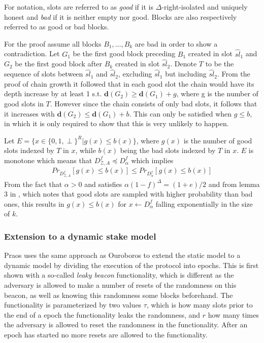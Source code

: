 For notation, slots are referred to as \emph{good} if it is $\Delta$-right-isolated and uniquely honest and \emph{bad} if it is neither empty nor good. Blocks are also respectively referred to as good or bad blocks.

For the proof assume all blocks $B_1,\dots,B_k$ are bad in order to show a contradiction. Let $G_1$ be the first good block preceding $B_1$ created in slot $\hat{sl}_1$ and $G_2$ be the first good block after $B_k$ created in slot $\hat{sl}_2$. Denote $T$ to be the sequence of slots between $\hat{sl}_1$ and $\hat{sl}_2$, excluding $\hat{sl}_1$ but including $\hat{sl}_2$. From the proof of chain growth it followed that in each good slot the chain would have its depth increase by at least 1 s.t. $\textbf{d}(G_2) \geq \textbf{d}(G_1) + g$, where g is the number of good slots in $T$. However since the chain consists of only bad slots, it follows that it increases with $\textbf{d}(G_2) \leq \textbf{d}(G_1) + b$. This can only be satisfied when $g \leq b$, in which it is only required to show that this is very unlikely to happen.

Let $E = \{x \in \{0,1,\perp\}^R | g(x) \leq b(x)\}$, where $g(x)$ is the number of good slots indexed by $T$ in $x$, while $b(x)$ being the bad slots indexed by $T$ in $x$. $E$ is monotone which means that $D^f_{\mathcal{Z},A} \preceq D^f_{\alpha}$ which implies
\begin{align}
    Pr_{D^f_{\mathcal{Z},A}}[g(x) \leq b(x)] \leq Pr_{D^f_{\alpha}}[g(x) \leq b(x)]
\end{align}
From the fact that $\alpha > 0$ and satisfies $\alpha(1-f)^{\Delta} = (1+e)/2$ and from lemma 3 in \cite{ouroboros-praos}, which notes that good slots are sampled with higher probability than bad ones, this results in $g(x) \leq b(x)$ for $x \xleftarrow{} D^f_{\alpha}$ falling exponentially in the size of $k$.

\subsubsection{Extension to a dynamic stake model}
Praos uses the same approach as Ouroboros to extend the static model to a dynamic model by dividing the execution of the protocol into epochs. This is first shown with a so-called \emph{leaky beacon} functionality, which is different as the adversary is allowed to make a number of resets of the randomness on this beacon, as well as knowing this randomness some blocks beforehand. The functionality is parameterized by two values $\tau$, which is how many slots prior to the end of a epoch the functionality leaks the randomness, and $r$ how many times the adversary is allowed to reset the randomness in the functionality. After an epoch has started no more resets are allowed to the functionality.\\

